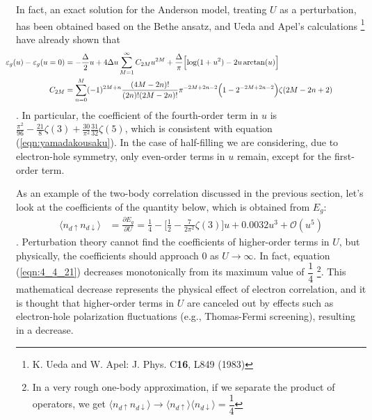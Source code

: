 \documentclass[a4j]{jarticle}
\begin{document}
In fact, an exact solution for the Anderson model, treating $U$ as a perturbation, has been obtained based on the Bethe ansatz, and Ueda and Apel's calculations
\footnote{
	K. Ueda and W. Apel: J. Phys. C{\bf 16}, L849 (1983)
}
have already shown that
\begin{align}
	\hspace{-5mm}
	\varepsilon_{g}(u)-
	\varepsilon_{g}(u=0)
	 & =
	-
	\frac{\Delta}{2}
	u
	+
	4 \Delta
	u
	\sum_{M=1}^{\infty}
	C_{2M}
	u^{2M}
	+
	\frac{\Delta}{\pi}
	\Big[
	{\rm log}(1 + u^{2})
	-
	2 u \ \!
	{\rm arctan}
	(u)
	\Big]
	\\
	C_{2M}
	 & =
	\sum_{n=0}^{M}
	(-1)^{2M+n}
	\frac{(4M-2n)!}{(2n)!(2M-2n)!}
	\pi^{-2M+2n-2}
	\Big( 1-2^{-2M+2n-2} \Big)
	\zeta(2M-2n+2)
	\hspace{15mm}
\end{align}
.
In particular, the coefficient of the fourth-order term in $u$ is $
	\displaystyle \frac{\pi^{2}}{96}
	-
	\displaystyle \frac{21}{8}
	\zeta(3)
	+
	\displaystyle \frac{30}{\pi^{2}}
	\displaystyle \frac{31}{32}
	\zeta(5)
$, which is consistent with equation (\ref{eqn:yamadakousaku}).
In the case of half-filling we are considering, due to electron-hole symmetry, only even-order terms in $u$ remain, except for the first-order term.

As an example of the two-body correlation discussed in the previous section, let's look at the coefficients of the quantity below, which is obtained from $E_{g}$:
\begin{align}
	\langle n_{d \uparrow} n_{d \downarrow} \rangle
	 & =
	\frac{\partial E_{g}}{\partial U}
	=
	\frac{1}{4}
	-
	\bigg[
		\frac{1}{2}
		-
		\frac{7}{2 \pi^{2}}
		\zeta(3)
		\bigg]
	u
	+
	0.0032 u^{3}
	+
	\mathcal{O}(u^{5})
	\label{eqn:4_4_21}
\end{align}
.
Perturbation theory cannot find the coefficients of higher-order terms in $U$, but physically, the coefficients should approach 0 as $U \to \infty$.
In fact, equation (\ref{eqn:4_4_21}) decreases monotonically from its maximum value of $\dfrac{1}{4}$
\footnote{
	In a very rough one-body approximation, if we separate the product of operators, we get $
		\langle n_{d \uparrow} n_{d \downarrow} \rangle
		\to
		\langle n_{d \uparrow} \rangle
		\langle n_{d \downarrow} \rangle
		=
		\dfrac{1}{4}
	$
}.
This mathematical decrease represents the physical effect of electron correlation, and it is thought that higher-order terms in $U$ are canceled out by effects such as electron-hole polarization fluctuations (e.g., Thomas-Fermi screening), resulting in a decrease.
\end{document}
